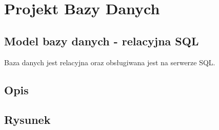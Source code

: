 \section{Projekt Bazy Danych}
    \subsection{Model bazy danych - relacyjna SQL}
        Baza danych jest relacyjna oraz obsługiwana jest na serwerze SQL.
    \subsection{Opis} 
    \subsection{Rysunek}